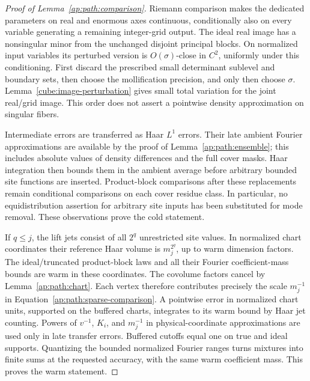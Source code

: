 \begin{proof}[Proof of Lemma~\ref{ap:path:comparison}]
Riemann comparison makes the dedicated parameters on real and
enormous axes continuous, conditionally also on every variable
generating a remaining integer-grid output.  The ideal real image
has a nonsingular minor from the unchanged disjoint principal
blocks.  On normalized input variables its perturbed version is
$O(\sigma)$-close in $C^2$, uniformly under this conditioning.
First discard the prescribed small determinant sublevel and
boundary sets, then choose the mollification precision, and only
then choose $\sigma$.  Lemma~\ref{cube:image-perturbation} gives
small total variation for the joint real/grid image.  This order
does not assert a pointwise density approximation on singular
fibers.

Intermediate errors are transferred as Haar $L^1$ errors.  Their
late ambient Fourier approximations are available by the proof of
Lemma~\ref{ap:path:ensemble}; this includes absolute values of
density differences and the full cover masks.  Haar integration
then bounds them in the ambient average before arbitrary bounded
site functions are inserted.  Product-block comparisons after
these replacements remain conditional comparisons on each cover
residue class.  In particular, no equidistribution assertion for
arbitrary site inputs has been substituted for mode removal.
These observations prove the cold statement.

If $q\le j$, the lift jets consist of all $2^q$ unrestricted site
values.  In normalized chart coordinates their reference Haar
volume is $m_j^{2^q}$, up to warm dimension factors.  The
ideal/truncated product-block laws and all their Fourier
coefficient-mass bounds are warm in these coordinates.  The
covolume factors cancel by Lemma~\ref{ap:path:chart}.
Each vertex therefore contributes precisely the scale $m_j^{-1}$
in Equation~\eqref{ap:path:sparse-comparison}.  A pointwise error
in normalized chart units, supported on the buffered charts,
integrates to its warm bound by Haar jet counting.  Powers of
$v^{-1}$, $K_i$, and $m_j^{-1}$ in physical-coordinate
approximations are used only in late transfer errors.
Buffered cutoffs equal one on true and ideal supports.  Quantizing
the bounded normalized Fourier ranges turns mixtures into finite
sums at the requested accuracy, with the same warm coefficient
mass.  This proves the warm statement.
\end{proof}


